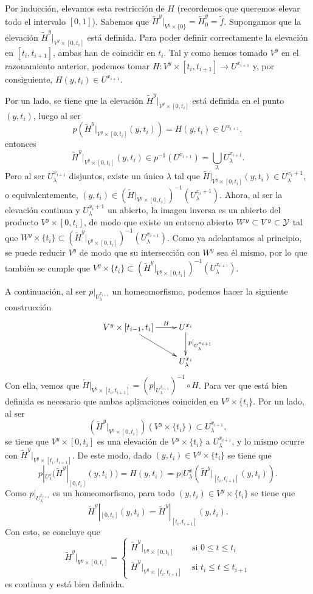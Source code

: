 \begin{itemize}
Por inducción, elevamos esta restricción de $H$ (recordemos que queremos elevar todo el intervalo $[0,1]$). Sabemos que $\tilde{H}^y |_{V^y\times \{0\}}=\tilde{H}_0^y=\tilde{f}$. Supongamos que la elevación $\tilde{H}^y |_{V^y\times [0,t_i]}$ está definida. Para poder definir correctamente la elevación en $[t_i,t_{i+1}]$, ambas han de coincidir en $t_i$. Tal y como hemos tomado $V^y$ en el razonamiento anterior, podemos tomar $H:V^y\times[t_i,t_{i+1}]\to U^{x_{i+1}}$ y, por consiguiente, $H(y,t_i)\in U^{x_{i+1}}$. 

Por un lado, se tiene que la elevación $\tilde{H}^y|_{V^y\times[0,t_i]}$ está definida en el punto $(y,t_i)$, luego al ser 
\[p(\tilde{H}^y|_{V^y\times [0,t_i]}(y,t_i))=H(y,t_i)\in U^{x_{i+1}},\]
entonces
\[\tilde{H}^y|_{V^y\times [0,t_i]}(y,t_i)\in p^{-1}(U^{x_{i+1}})=\bigcup_\lambda U_\lambda^{x_{i+1}}.\]
Pero al ser $U^{x_{i+1}}_\lambda$ disjuntos, existe un único $\lambda$ tal que $\tilde{H}|_{V^y\times[0,t_i]}(y,t_i)\in U_{\lambda}^{x_i+1}$, o equivalentemente, $(y,t_i)\in (\tilde{H}|_{V^y\times[0,t_i]})^{-1}(U_{\lambda}^{x_i+1})$. Ahora, al ser la elevación continua y $U_{\lambda}^{x_i+1}$ un abierto, la imagen inversa es un abierto del producto $V^y\times [0,t_i]$, de modo que existe un entorno abierto $W^y\subset V^y\subset \mathcal{Y}$ tal que $W^y\times\{t_i\} \subset (\tilde{H}^y|_{V^y\times [0,t_i]})^{-1}(U_\lambda^{x_{i+1}})$. Como ya adelantamos al principio, se puede reducir $V^y$ de modo que su intersección con $W^y$ sea él mismo, por lo que también se cumple que $V^y\times\{t_i\} \subset (\tilde{H}^y|_{V^y\times [0,t_i]})^{-1}(U_\lambda^{x_{i+1}})$. 

A continuación, al ser $p|_{U_\lambda^{x_{i+1}}}$ un homeomorfismo, podemos hacer la siguiente construcción
		\[\xymatrix{
V^y\times[t_{i-1},t_i] \ar[r]^-H \ar[rd] &
U^{x_i} \ar[d]^{p|_{U_{\lambda}^{x_{i+1}}}} \\
&U_{\lambda}^{x_i}}\]
Con ella, vemos que $\tilde{H}|_{V^y\times [t_i,t_{i+1}]}=(p|_{U_{\lambda}^{x_{i+1}}})^{-1}\circ H$. Para ver que está bien definida es necesario que ambas aplicaciones coinciden en $V^y\times \{t_i\}$. Por un lado, al ser
\[(\tilde{H}^y|_{V^y\times [0,t_i]})(V^y\times\{t_i\}) \subset U_\lambda^{x_{i+1}},\]
se tiene que $V^y\times [0,t_i]$ es una elevación de $V^y\times\{t_i\}$ a $U_\lambda^{x_{i+1}}$, y lo mismo ocurre con $\tilde{H}^y|_{V^y\times [t_i,t_{i+1}]}$. De este modo, dado $(y,t_i)\in V^y\times\{t_i\}$ se tiene que 
\[p|_{U_{\lambda}^x}(\tilde{H}^y|_{[0,t_{i}]}(y,t_i))=H(y,t_i)=p|{U_{\lambda}^x}(\tilde{H}^y|_{[t_i,t_{i+1}]}(y,t_i)).\]
Como $p|_{U_{\lambda}^{x_{i+1}}}$ es un homeomorfismo, para todo $(y,t_i)\in V^y\times\{t_i\}$ se tiene que 
\[\tilde{H}^y|_{[0,t_{i}]}(y,t_i)=\tilde{H}^y|_{[t_i,t_{i+1}]}(y,t_i).\]
Con esto, se concluye que
\[ \tilde{H}^y|_{V^y\times [0,t_{i}]} = \begin{cases}
\tilde{H}^y|_{V^y\times [0,t_{i}]} & \text{ si } 0\leq t \leq t_i \\
\tilde{H}^y|_{V^y\times [t_i,t_{i+1}]} & \text{ si } t_i\leq t \leq t_{i+1}
\end{cases}\]
es continua y está bien definida. 


\end{itemize}
